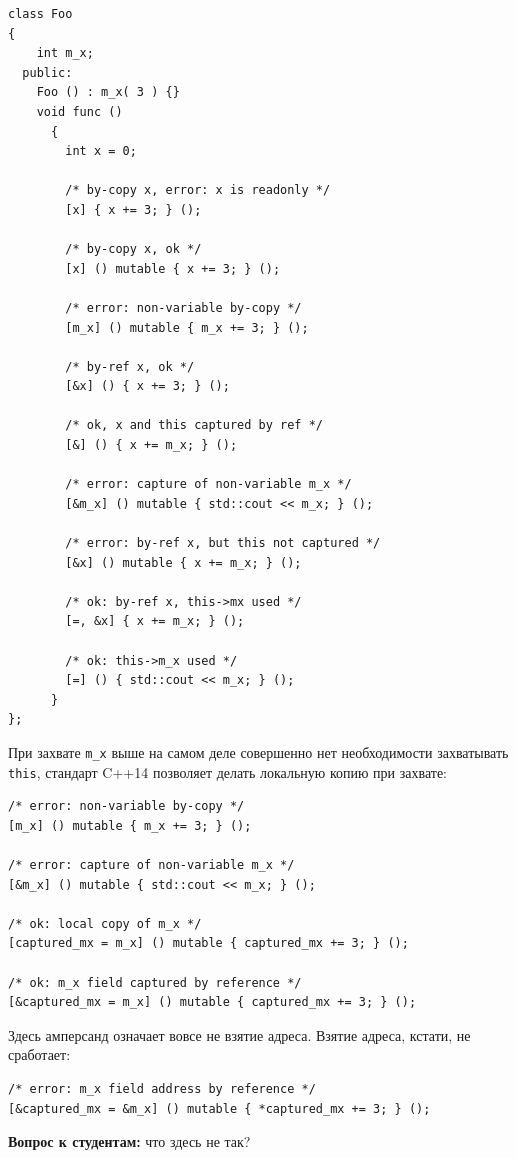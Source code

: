\documentclass[a4paper,12pt,oneside]{article}
\begin{document}
\begin{lstlisting}
class Foo
{
    int m_x;
  public:
    Foo () : m_x( 3 ) {}
    void func ()
      {
        int x = 0;

        /* by-copy x, error: x is readonly */
        [x] { x += 3; } ();
        
        /* by-copy x, ok */
        [x] () mutable { x += 3; } ();

        /* error: non-variable by-copy */
        [m_x] () mutable { m_x += 3; } (); 

        /* by-ref x, ok */
        [&x] () { x += 3; } ();

        /* ok, x and this captured by ref */
        [&] () { x += m_x; } ();

        /* error: capture of non-variable m_x */
        [&m_x] () mutable { std::cout << m_x; } (); 

        /* error: by-ref x, but this not captured */
        [&x] () mutable { x += m_x; } (); 

        /* ok: by-ref x, this->mx used */
        [=, &x] { x += m_x; } ();

        /* ok: this->m_x used */
        [=] () { std::cout << m_x; } ();
      }
};
\end{lstlisting}

При захвате \lstinline!m_x! выше на самом деле совершенно нет необходимости захватывать \lstinline!this!, стандарт C++14 позволяет делать локальную копию при захвате:

\begin{lstlisting}
/* error: non-variable by-copy */
[m_x] () mutable { m_x += 3; } (); 

/* error: capture of non-variable m_x */
[&m_x] () mutable { std::cout << m_x; } (); 

/* ok: local copy of m_x */
[captured_mx = m_x] () mutable { captured_mx += 3; } (); 

/* ok: m_x field captured by reference */
[&captured_mx = m_x] () mutable { captured_mx += 3; } (); 
\end{lstlisting}

Здесь амперсанд означает вовсе не взятие адреса. Взятие адреса, кстати, не сработает:

\begin{lstlisting}
/* error: m_x field address by reference */
[&captured_mx = &m_x] () mutable { *captured_mx += 3; } ();
\end{lstlisting}

\textbf{Вопрос к студентам:} что здесь не так?
\end{document}

